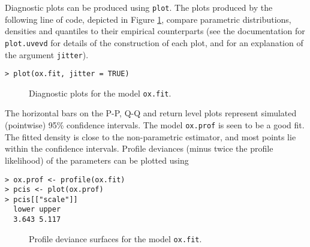 \documentclass[11pt,a4paper]{article}
\begin{document}
Diagnostic plots can be produced using \verb+plot+.
The plots produced by the following line of code, depicted in Figure \ref{oxdiag}, compare parametric distributions, densities and quantiles to their empirical counterparts (see the documentation for \verb+plot.uvevd+ for details of the construction of each plot, and for an explanation of the argument \verb+jitter+).

\begin{verbatim}
> plot(ox.fit, jitter = TRUE)
\end{verbatim}

\begin{figure}
\begin{center}
\vspace{-1.5cm}
\hspace{0cm}
\hspace{0cm} 
\hspace{0cm}
\end{center} 
\caption{Diagnostic plots for the model \texttt{ox.fit}.}
\label{oxdiag}
\end{figure}

The horizontal bars on the P-P, Q-Q and return level plots represent simulated (pointwise) 95\% confidence intervals.
The model \verb+ox.prof+ is seen to be a good fit. 
The fitted density is close to the non-parametric estimator, and most points lie within the confidence intervals.
Profile deviances (minus twice the profile likelihood) of the parameters can be plotted using

\begin{verbatim}
> ox.prof <- profile(ox.fit)
> pcis <- plot(ox.prof)
> pcis[["scale"]]
  lower upper 
  3.643 5.117 
\end{verbatim}

\begin{figure}
\begin{center}
\vspace{-1.5cm}
\hspace{0cm}
\hspace{0cm} 
\hspace{0cm}
\end{center} 
\caption{Profile deviance surfaces for the model \texttt{ox.fit}.}
\label{oxprof}
\end{figure}
\end{document}

